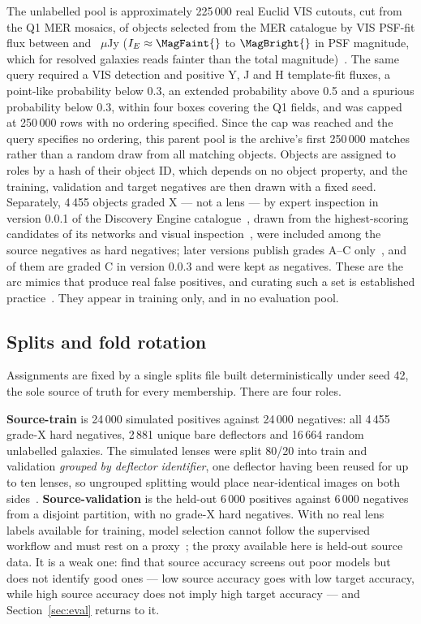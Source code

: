 The unlabelled pool is approximately 225\,000 real Euclid VIS cutouts, cut from the
Q1 MER mosaics, of objects selected from the MER catalogue by VIS PSF-fit flux between
\FluxMin{} and \FluxMax{}~$\mu$Jy ($I_E \approx \MagFaint{}$ to $\MagBright{}$ in PSF
magnitude, which for resolved galaxies reads fainter than the total
magnitude)~\citep{euclidq1mer}. The same query required a VIS detection and positive Y, J
and H template-fit fluxes, a point-like probability below 0.3, an extended probability above
0.5 and a spurious probability below 0.3, within four boxes covering the Q1 fields, and was
capped at 250\,000 rows with no ordering specified. Since the cap was reached and the query
specifies no ordering, this parent pool is the archive's first 250\,000 matches rather than a
random draw from all matching objects. Objects are assigned to roles by a hash of their object
ID, which depends on no object property, and the training, validation and target negatives are
then drawn with a fixed seed. Separately,
4\,455 objects graded X --- not a lens --- by expert inspection in version 0.0.1 of the
Discovery Engine catalogue~\citep{discoveryenginecat001}, drawn from the highest-scoring
candidates of its networks and visual inspection~\citep{discoveryengineA}, were included
among the source negatives as hard negatives; later versions publish grades A--C
only~\citep{discoveryenginecat}, and \GradeXnowC{} of them are graded C in version 0.0.3
and were kept as negatives. These are the arc mimics that produce real false positives, and
curating such a set is established practice~\citep{holismokesXI, astrovink}. They appear in training
only, and in no evaluation pool.

\subsection{Splits and fold rotation}

Assignments are fixed by a single splits file built deterministically under seed 42, the
sole source of truth for every membership. There are four roles.

\textbf{Source-train} is 24\,000 simulated positives against 24\,000 negatives: all 4\,455
grade-X hard negatives, 2\,881 unique bare deflectors and 16\,664 random unlabelled
galaxies. The simulated lenses were split 80/20 into train and validation \emph{grouped by
deflector identifier}, one deflector having been reused for up to ten lenses, so ungrouped
splitting would place near-identical images on both sides~\citep{astrovink}.
\textbf{Source-validation} is the held-out 6\,000 positives against 6\,000 negatives from
a disjoint partition, with no grade-X hard negatives. With no real lens labels available
for training, model selection cannot follow the supervised workflow and must rest on a
proxy~\citep{rlsbench}; the proxy available here is held-out source data. It is a weak one: \citet{musgrave2021realitycheck} find that
source accuracy screens out poor models but does not identify good ones --- low source
accuracy goes with low target accuracy, while high source accuracy does not imply high
target accuracy --- and Section~\ref{sec:eval} returns to it.

